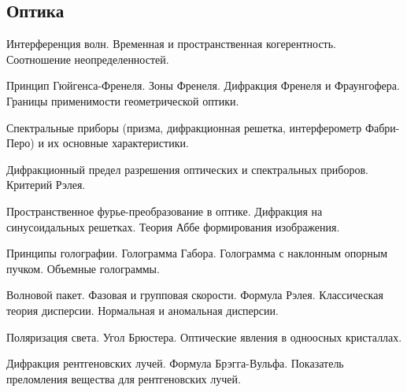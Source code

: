 \subsection*{Оптика}
\begin{enumerate*}
\setcounter{enumi}{34}
\item Интерференция волн. Временная и пространственная когерентность. Соотношение неопределенностей.
\item Принцип Гюйгенса-Френеля. Зоны Френеля. Дифракция Френеля и Фраунгофера. Границы применимости геометрической оптики.
\item Спектральные приборы (призма, дифракционная решетка, интерферометр Фабри-Перо) и их основные характеристики.
\item Дифракционный предел разрешения оптических и спектральных приборов. Критерий Рэлея.
\item Пространственное фурье-преобразование в оптике. Дифракция на синусоидальных решетках. Теория Аббе формирования изображения.
\item Принципы голографии. Голограмма Габора. Голограмма с наклонным опорным пучком. Объемные
голограммы.
\item Волновой пакет. Фазовая и групповая скорости. Формула Рэлея. Классическая теория дисперсии.
Нормальная и аномальная дисперсии.
\item Поляризация света. Угол Брюстера. Оптические явления в одноосных кристаллах.
\item Дифракция рентгеновских лучей. Формула Брэгга-Вульфа. Показатель преломления вещества для
рентгеновских лучей.
\end{enumerate*}


